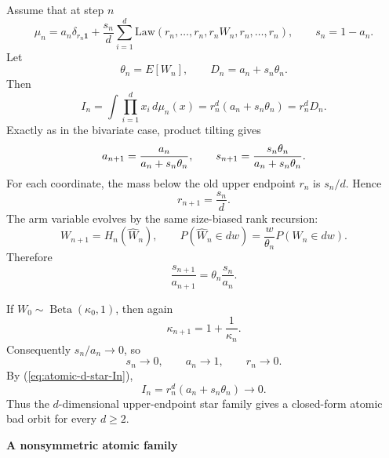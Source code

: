 \documentclass[onecolumn]{article}
\providecommand{\func}[1]{\operatorname{#1}}
\begin{document}
Assume that at step $n$ 
\begin{equation}
\mu_n = a_n\delta_{r_n\mathbf{1}} + \frac{s_n}{d}\sum_{i=1}^d \mathrm{Law}%
(r_n,\ldots,r_n,r_nW_n,r_n,\ldots,r_n), \qquad s_n=1-a_n.
\label{eq:atomic-d-star-n}
\end{equation}
Let 
\begin{equation*}
\theta_n=E[W_n], \qquad D_n=a_n+s_n\theta_n.
\end{equation*}
Then 
\begin{equation}
I_n = \int \prod_{i=1}^d x_i\,d\mu_n(x) = r_n^d(a_n+s_n\theta_n) = r_n^dD_n.
\label{eq:atomic-d-star-In}
\end{equation}
Exactly as in the bivariate case, product tilting gives 
\begin{equation}
a_{n+1} = \frac{a_n}{a_n+s_n\theta_n}, \qquad s_{n+1} = \frac{s_n\theta_n}{%
a_n+s_n\theta_n}.  \label{eq:atomic-d-star-mass-recursion}
\end{equation}
For each coordinate, the mass below the old upper endpoint $r_n$ is $s_n/d$.
Hence 
\begin{equation}
r_{n+1}=\frac{s_n}{d}.  \label{eq:atomic-d-star-r-recursion}
\end{equation}
The arm variable evolves by the same size-biased rank recursion: 
\begin{equation}
W_{n+1}=H_n(\widehat W_n), \qquad P(\widehat W_n\in dw) = \frac{w}{\theta_n}%
P(W_n\in dw).  \label{eq:atomic-d-star-W-recursion}
\end{equation}
Therefore 
\begin{equation}
\frac{s_{n+1}}{a_{n+1}} = \theta_n\frac{s_n}{a_n}.
\label{eq:atomic-d-star-ratio}
\end{equation}

If $W_{0}\sim \func{Beta}(\kappa _{0},1)$, then again 
\begin{equation*}
\kappa _{n+1}=1+\frac{1}{\kappa _{n}}.
\end{equation*}%
Consequently $s_{n}/a_{n}\rightarrow 0$, so 
\begin{equation*}
s_{n}\rightarrow 0,\qquad a_{n}\rightarrow 1,\qquad r_{n}\rightarrow 0.
\end{equation*}%
By (\ref{eq:atomic-d-star-In}), 
\begin{equation*}
I_{n}=r_{n}^{d}(a_{n}+s_{n}\theta _{n})\longrightarrow 0.
\end{equation*}%
Thus the $d$-dimensional upper-endpoint star family gives a closed-form
atomic bad orbit for every $d\geq 2$.

\begin{flushleft}
\textbf{A nonsymmetric atomic family}
\end{flushleft}
\end{document}
